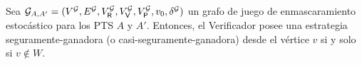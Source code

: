 \begin{theorem}\label{th:strat-W} 
  Sea
  $\mathcal{G}_{A,A'} = (V^{\mathcal{G}}, E^{\mathcal{G}}, V^{\mathcal{G}}_{\mathsf{R}}, V^{\mathcal{G}}_{\mathsf{V}}, V^{\mathcal{G}}_{\mathsf{P}}, v_0, \delta^{\mathcal{G}})$
  un grafo de juego de enmascaramiento estocástico para los PTS $A$ y $A'$.  Entonces, el
  Verificador posee una estrategia seguramente-ganadora (o casi-seguramente-ganadora) desde el vértice $v$ si y solo si
  $v \notin W$.
\end{theorem}

\noindent
\iffalse
